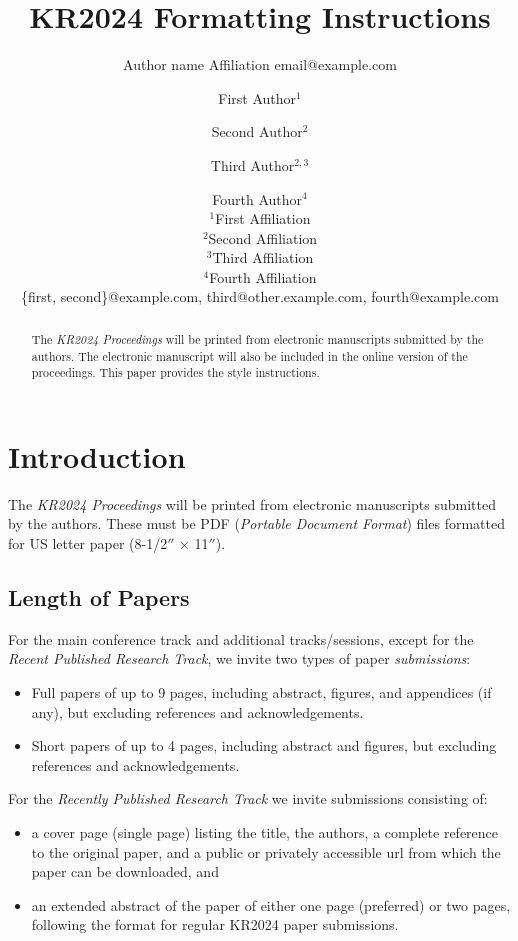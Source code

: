 \documentclass{article}
\title{KR2024 Formatting Instructions}
\author{%
    Author name
    \affiliations
    Affiliation
    \emails
    email@example.com    %
}
\author{%
First Author$^1$\and
Second Author$^2$\and
Third Author$^{2,3}$\and
Fourth Author$^4$ \\
\affiliations
$^1$First Affiliation\\
$^2$Second Affiliation\\
$^3$Third Affiliation\\
$^4$Fourth Affiliation \\
\emails
\{first, second\}@example.com,
third@other.example.com,
fourth@example.com
}
\begin{document}
\maketitle

\begin{abstract}
  The \textit{KR2024 Proceedings} will be printed from electronic
  manuscripts submitted by the authors. The electronic man\-u\-script will
  also be included in the online version of the proceedings. This paper
  provides the style instructions.
\end{abstract}

\section{Introduction}

The \textit{KR2024 Proceedings} will be printed from electronic
manuscripts submitted by the authors. These must be PDF (\emph{Portable
Document Format}) files formatted for US letter paper (8-1/2$''$ $\times$ 11$''$).

\subsection{Length of Papers}

For the main conference track and additional tracks/sessions, except for the
\emph{Recent Published Research Track}, we invite two types of paper
\emph{submissions}:
\begin{itemize}
\item Full papers of up to 9 pages, including abstract, figures, and appendices
  (if any), but excluding references and acknowledgements.
\item Short papers of up to 4 pages, including abstract and figures, but excluding
 references and acknowledgements.
\end{itemize}

For the \emph{Recently Published Research Track} we invite submissions consisting
of:
\begin{itemize}
\item a cover page (single page) listing the title, the authors, a complete
  reference to the original paper, and a public or privately accessible url
  from which the paper can be downloaded, and
\item an extended abstract of the paper of either one page (preferred) or two
  pages, following the format for regular KR2024 paper submissions.
\end{itemize}
\end{document}
